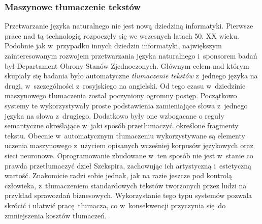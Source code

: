 \documentclass[a4paper, twoside, openright, 12pt]{report}
\begin{document}
            \subsubsection{Maszynowe tłumaczenie tekstów}
                Przetwarzanie języka naturalnego nie jest nową dziedziną informatyki. Pierwsze prace nad tą technologią
                rozpoczęły się we wczesnych latach 50. XX wieku. Podobnie jak w~przypadku innych dziedzin informatyki,
                największym zainteresowanym rozwojem przetwarzania języka naturalnego i~sponsorem badań był Departament
                Obrony Stanów Zjednoczonych. Głównym celem nad którym skupiały się badania było automatyczne
                \emph{tłumaczenie tekstów} z~jednego języka na drugi, w~szczególności z~rosyjskiego na
                angielski\cite{NLPHISTORY}. Od tego czasu w~dziedzinie maszynowego tłumaczenia został poczyniony
                ogromny postęp. Początkowo systemy te wykorzystywały proste podstawienia zamieniające słowa z~jednego
                języka na słowa z~drugiego. Dodatkowo były one wzbogacane o reguły semantyczne określające w~jaki
                sposób przetłumaczyć określone fragmenty tekstu.  Obecnie w~automatycznym tłumaczeniu wykorzystywane
                są elementy uczenia maszynowego z~użyciem opisanych wcześniej korpusów językowych oraz sieci neuronowe.
                Oprogramowanie zbudowane w~ten sposób nie jest w~stanie co prawda przetłumaczyć dzieł Szekspira,
                zachowując ich artystyczną i~estetyczną wartość. Znakomicie radzi sobie jednak, jak na razie jeszcze
                pod kontrolą człowieka, z~tłumaczeniem standardowych tekstów tworzonych przez ludzi na przykład
                sprawozdań biznesowych\cite{INTROTOMACHINETRANSLATION}. Wykorzystanie tego typu systemów pozwala skrócić i
                ułatwić pracę tłumacza, co w~konsekwencji przyczynia się do zmniejszenia kosztów tłumaczeń.
\end{document}
